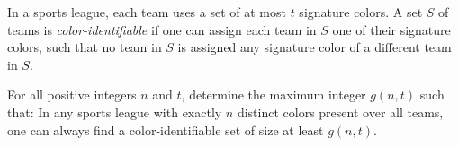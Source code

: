 In a sports league, each team uses a set of at most $t$ signature colors. A set $S$ of teams is \emph{color-identifiable} if one can assign each team in $S$ one of their signature colors, such that no team in $S$ is assigned any signature color of a different team in $S$.

For all positive integers $n$ and $t$, determine the maximum integer $g\left(n,t\right)$ such that: In any sports league with exactly $n$ distinct colors present over all teams, one can always find a color-identifiable set of size at least $g\left(n,t\right)$.